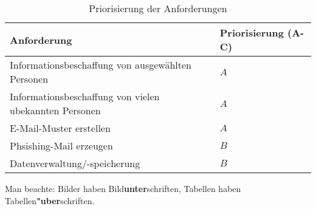 \begin{table}
	
	\caption{Priorisierung der Anforderungen}
	\label{tab:prio}
	\begin{center} 
		\begin{tabular}{|l|l|}
			\hline
			Anforderung & Priorisierung (A-C) \\
			\hline
			Informationsbeschaffung von ausgewählten Personen & $ A $ \\
			\hline
			Informationsbeschaffung von vielen ubekannten Personen & $ A $ \\
			\hline
			E-Mail-Muster erstellen & $ A $    \\
			\hline
			Phsishing-Mail erzeugen & $ B $   \\
			\hline
			Datenverwaltung/-speicherung & $ B $   \\
			\hline
		\end{tabular}
	\end{center}
\end{table}
\FloatBarrier
Man beachte: Bilder haben Bild{\bf unter}schriften, 
Tabellen haben Tabellen{\bf "uber}schriften.
